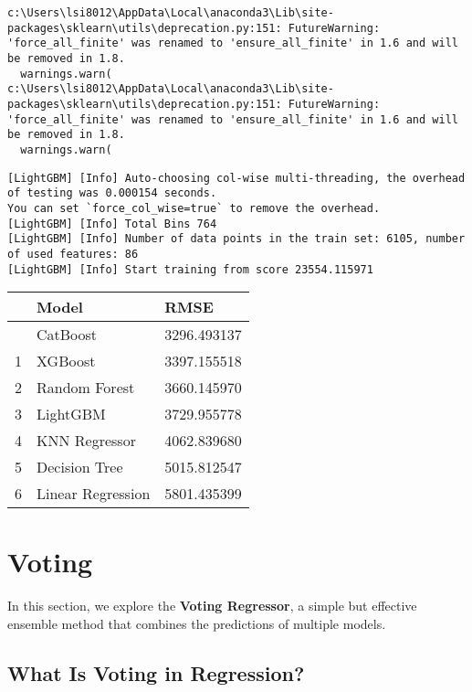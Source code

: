 \documentclass[
  letterpaper,
  DIV=11,
  numbers=noendperiod]{scrreprt}
\begin{document}
\begin{verbatim}
c:\Users\lsi8012\AppData\Local\anaconda3\Lib\site-packages\sklearn\utils\deprecation.py:151: FutureWarning: 'force_all_finite' was renamed to 'ensure_all_finite' in 1.6 and will be removed in 1.8.
  warnings.warn(
c:\Users\lsi8012\AppData\Local\anaconda3\Lib\site-packages\sklearn\utils\deprecation.py:151: FutureWarning: 'force_all_finite' was renamed to 'ensure_all_finite' in 1.6 and will be removed in 1.8.
  warnings.warn(
\end{verbatim}

\begin{verbatim}
[LightGBM] [Info] Auto-choosing col-wise multi-threading, the overhead of testing was 0.000154 seconds.
You can set `force_col_wise=true` to remove the overhead.
[LightGBM] [Info] Total Bins 764
[LightGBM] [Info] Number of data points in the train set: 6105, number of used features: 86
[LightGBM] [Info] Start training from score 23554.115971
\end{verbatim}

\begin{longtable}[]{@{}lll@{}}
\toprule\noalign{}
& Model & RMSE \\
\midrule\noalign{}
\endhead
\bottomrule\noalign{}
\endlastfoot
0 & CatBoost & 3296.493137 \\
1 & XGBoost & 3397.155518 \\
2 & Random Forest & 3660.145970 \\
3 & LightGBM & 3729.955778 \\
4 & KNN Regressor & 4062.839680 \\
5 & Decision Tree & 5015.812547 \\
6 & Linear Regression & 5801.435399 \\
\end{longtable}

\section{Voting}\label{voting}

In this section, we explore the \textbf{Voting Regressor}, a simple but
effective ensemble method that combines the predictions of multiple
models.

\subsection{What Is Voting in
Regression?}\label{what-is-voting-in-regression}
\end{document}
